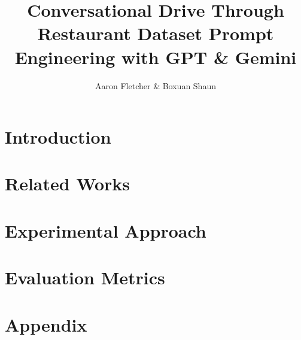 \documentclass{article}
\title{Conversational Drive Through Restaurant Dataset\: Prompt Engineering with GPT \& Gemini}
\author{Aaron Fletcher \& Boxuan Shaun}
\begin{document}
\maketitle
\section{Introduction}

\newpage
\section{Related Works}

\newpage
\section{Experimental Approach}

\section{Evaluation Metrics}
\newpage


\appendix
\section{Appendix}
\end{document}
